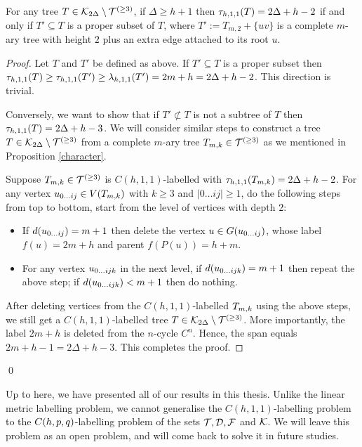 \begin{proposition}
For any tree $T \in {\cal K}_{2\Delta} \setminus {\cal T}^{(\ge 3)}$, if $\Delta \ge h+1$ then $\th11(T) = 2\Delta+h-2$ if and only if $T' \subseteq T$ is a proper subset of $T$, where $T' := T_{m,2} + \{uv\}$ is a complete $m$-ary tree with height $2$ plus an extra edge attached to its root $u$. 
\end{proposition}

\begin{proof}
Let $T$ and $T'$ be defined as above. If $T' \subseteq T$ is a proper subset then $\th11(T) \ge \th11(T') \ge \lamh11(T') = 2m+h = 2\Delta+h-2$. This direction is trivial. 

Conversely, we want to show that if $T' \not\subset T$ is not a subtree of $T$ then $\th11(T) = 2\Delta+h-3$. We will consider similar steps to construct a tree $T \in {\cal K}_{2\Delta} \setminus {\cal T}^{(\ge 3)}$ from a complete $m$-ary tree $T_{m,k} \in {\cal T}^{(\ge 3)}$ as we mentioned in Proposition \ref{character}.

Suppose $T_{m,k} \in {\cal T}^{(\ge 3)}$ is $C(h,1,1)$-labelled with $\th11(\tmk) = 2\Delta+h-2$. For any vertex $u_{0\dots ij} \in V(T_{m,k})$ with $k \ge 3$ and $|0\dots ij| \ge 1$, do the following steps from top to bottom, start from the level of vertices with depth $2$:
\begin{itemize}
\item If $d(u_{0\dots ij}) = m+1$ then delete the vertex $u \in G(u_{0\dots ij})$, whose label $f(u) = 2m+h$ and parent $f(P(u)) = h+m$.  
\item For any vertex $u_{0\dots ijk}$ in the next level, if $d(u_{0\dots ijk}) = m+1$ then repeat the above step; if $d(u_{0\dots ijk}) < m+1$ then do nothing. 
\end{itemize}

After deleting vertices from the $C(h,1,1)$-labelled $T_{m,k}$ using the above steps, we still get a $C(h,1,1)$-labelled tree $T \in {\cal K}_{2\Delta} \setminus {\cal T}^{(\ge 3)}$. More importantly, the label $2m+h$ is deleted from the $n$-cycle $C^n$. Hence, the span equals $2m+h-1 = 2\Delta+h-3$. This completes the proof. 
\end{proof}
\qed

Up to here, we have presented all of our results in this thesis. Unlike the linear metric labelling problem, we cannot generalise the $C(h,1,1)$-labelling problem to the $C(h,p,q)$-labelling problem of the sets ${\cal T}, {\cal D}, {\cal F}$ and ${\cal K}$. We will leave this problem as an open problem, and will come back to solve it in future studies. 















